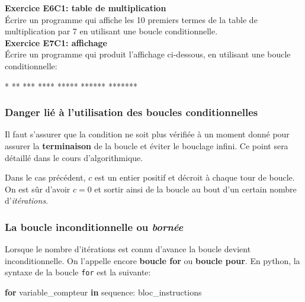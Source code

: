 \documentclass[11pt,french]{article}
\newenvironment{Shaded}{}{}
\newcommand{\KeywordTok}[1]{\textcolor[rgb]{0.00,0.44,0.13}{\textbf{{#1}}}}
\newcommand{\NormalTok}[1]{{#1}}
\newcommand{\ControlFlowTok}[1]{\textcolor[rgb]{0.00,0.44,0.13}{\textbf{{#1}}}}
\newcommand{\OperatorTok}[1]{\textcolor[rgb]{0.40,0.40,0.40}{{#1}}}
\begin{document}
    \textbf{Exercice E6C1: table de multiplication}\\
Écrire un programme qui affiche les 10 premiers termes de la table de
multiplication par 7 en utilisant une boucle conditionnelle.\\
\textbf{Exercice E7C1: affichage}\\
\'Ecrire un programme qui produit l'affichage ci-dessous, en utilisant une
boucle conditionnelle:

\begin{Shaded}
\begin{Highlighting}[]
\OperatorTok{*}
\OperatorTok{**}
\OperatorTok{***}
\OperatorTok{****}
\OperatorTok{*****}
\OperatorTok{******}
\OperatorTok{*******}
\end{Highlighting}
\end{Shaded}

    \hypertarget{danger-liuxe9-uxe0-lutilisation-des-boucles-conditionnelles}{%
\subsubsection{Danger lié à l'utilisation des boucles
conditionnelles}\label{danger-liuxe9-uxe0-lutilisation-des-boucles-conditionnelles}}

Il faut s'assurer que la condition ne soit plus vérifiée à un moment
donné pour assurer la \textbf{terminaison} de la boucle et éviter le
bouclage infini. Ce point sera détaillé dans le cours d'algorithmique.\par
Dans le cas précédent, \(c\) est un entier positif et décroit à chaque
tour de boucle. On est sûr d'avoir \(c=0\) et sortir ainsi de la boucle
au bout d'un certain nombre d'\emph{itérations}.

\hypertarget{boucle-inconditionnelle}{%
\subsubsection{La boucle inconditionnelle ou \emph{bornée}}\label{boucle-inconditionnelle}}
Lorsque le nombre d'itérations est connu d'avance la boucle devient
inconditionnelle. On l'appelle encore \textbf{boucle for} ou
\textbf{boucle pour}.
En python, la syntaxe de la boucle \texttt{for} est la suivante:

\begin{Shaded}
\begin{Highlighting}[]
\ControlFlowTok{for}\NormalTok{ variable_compteur }\KeywordTok{in}\NormalTok{ sequence:}
\NormalTok{    bloc_instructions}
\end{Highlighting}
\end{Shaded}
\end{document}
